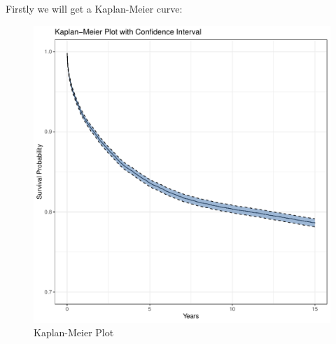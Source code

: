 \documentclass[12pt]{article} %
\begin{document}
\noindent Firstly we will get a Kaplan-Meier curve:
\begin{figure}[h]
	\centering
	\includegraphics[scale=.5]{Kaplan-Meier.pdf} 
	\caption{Kaplan-Meier Plot}
\end{figure}
\end{document}
